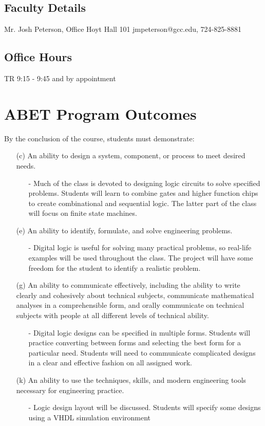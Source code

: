 \documentclass{article}
\begin{document}
\subsection{Faculty Details}
Mr. Josh Peterson, Office Hoyt Hall 101 jmpeterson@gcc.edu, 724-825-8881
\subsection{Office Hours}
TR 9:15 - 9:45 and by appointment
\section{ABET Program Outcomes}
By the conclusion of the course, students must demonstrate:
\begin{itemize}
\item[(c)] An ability to design a system, component, or process to meet desired needs.
\begin{itemize}
\item[-]Much of the class is devoted to designing logic circuits to solve specified problems.  Students will learn to combine gates and higher function chips to create combinational and sequential logic.  The latter part of the class will focus on finite state machines.
\end{itemize}
 \item[(e)] An ability to identify, formulate, and solve engineering problems.
 \begin{itemize}
 \item[-]Digital logic is useful for solving many practical problems, so real-life examples will be used throughout the class.  The project will have some freedom for the student to identify a realistic problem.
 \end{itemize}
  \item[(g)] An ability to communicate effectively, including the ability to write clearly and cohesively about technical subjects, communicate mathematical analyses in a comprehensible form, and orally communicate on technical subjects with people at all different levels of technical ability.
  \begin{itemize}
  \item[-]Digital logic designs can be specified in multiple forms.  Students will practice converting between forms and selecting the best form for a particular need.  Students will need to communicate complicated designs in a clear and effective fashion on all assigned work.
  \end{itemize}
   \item[(k)] An ability to use the techniques, skills, and modern engineering tools necessary for engineering practice.
   \begin{itemize}
   \item[-]Logic design layout will be discussed.  Students will specify some designs using a VHDL simulation environment
   \end{itemize}
\end{itemize}
\end{document}
